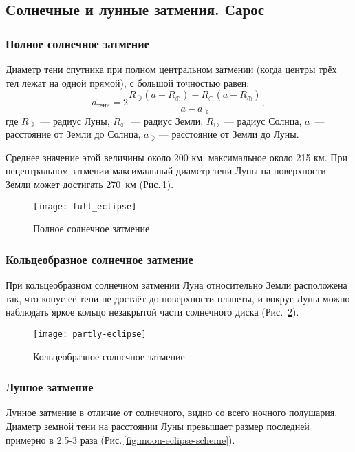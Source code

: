 \subsection{Солнечные и лунные затмения. Сарос}
\subsubsection{Полное солнечное затмение}
Диаметр тени спутника при полном центральном затмении (когда центры трёх тел лежат на одной прямой), с большой точностью равен: \begin{equation}
d_\text{тени} = 2 \frac{R_{\rightmoon}(a - R_\oplus) - R_\odot \left( a - R_\oplus \right)}{a - a_\rightmoon},
\end{equation}
где $R_\rightmoon$~--- радиус Луны, $R_\oplus$~--- радиус Земли, $R_\odot$~--- радиус Солнца, $a$~--- расстояние от Земли до Солнца, $a_\rightmoon$ --- расстояние от Земли до Луны.

Среднее значение  этой величины около 200 км, максимальное около 215 км. При нецентральном затмении максимальный диаметр тени Луны на поверхности Земли может достигать 270~км (Рис.\,\ref{fig:eclipses-full-solar-eslipse}).

\begin{figure}[h!]
\centering
\texttt{[image: full\_eclipse]}
\caption{Полное солнечное затмение}
\label{fig:eclipses-full-solar-eslipse}
\end{figure}

\subsubsection{Кольцеобразное солнечное затмение}При кольцеобразном солнечном затмении Луна относительно Земли расположена так, что конус её тени не достаёт до поверхности планеты, и вокруг Луны можно наблюдать яркое кольцо незакрытой части солнечного диска (Рис.~\ref{fig:eclipses-circle-solar-eslipse}).
\begin{figure}[h!]
\texttt{[image: partly-eclipse]}
\caption{Кольцеобразное солнечное затмение}
\label{fig:eclipses-circle-solar-eslipse}
\end{figure}

\subsubsection{Лунное затмение}

Лунное затмение в отличие от солнечного, видно со всего ночного полушария. Диаметр земной тени на расстоянии Луны превышает размер последней примерно в 2.5-3 раза (Рис.\,\ref{fig:moon-eclipse-scheme}).

